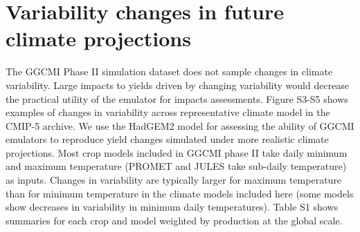 \documentclass[12pt]{article}
\begin{document}
\section{Variability changes in future climate projections}
\begin{flushleft}
The GGCMI Phase II simulation dataset does not sample changes in climate variability. Large impacts to yields driven by changing variability would decrease the practical utility of the emulator for impacts assessments.
Figure S3-S5 shows examples of changes in variability across representative climate model in the CMIP-5 archive. 
We use the HadGEM2 model for assessing the ability of GGCMI emulators to reproduce yield changes simulated under more realistic climate projections.
Most crop models included in GGCMI phase II take daily minimum and maximum temperature (PROMET and JULES take sub-daily temperature) as inputs. 
Changes in variability are typically larger for maximum temperature than for minimum temperature in the climate models included here (some models show decreases in variability in minimum daily temperatures).
Table S1 shows summaries for each crop and model weighted by production at the global scale. 
\end{flushleft}

\end{document}
